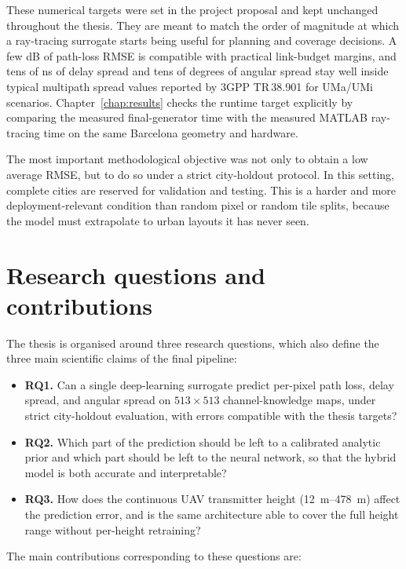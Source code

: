 These numerical targets were set in the project proposal and kept unchanged
throughout the thesis. They are meant to match the order of magnitude at
which a ray-tracing surrogate starts being useful for planning and coverage
decisions. A few dB of path-loss RMSE is compatible with practical link-budget
margins, and tens of ns of delay spread and tens of degrees of angular spread
stay well inside typical multipath spread values reported by 3GPP TR\,38.901
for UMa/UMi scenarios. Chapter~\ref{chap:results} checks the runtime target
explicitly by comparing the measured final-generator time with the measured
MATLAB ray-tracing time on the same Barcelona geometry and hardware.

The most important methodological objective was not only to obtain a low
average RMSE, but to do so under a strict city-holdout protocol. In this
setting, complete cities are reserved for validation and testing. This is a
harder and more deployment-relevant condition than random pixel or random tile
splits, because the model must extrapolate to urban layouts it has never seen.

\section{Research questions and contributions}

The thesis is organised around three research questions, which also define
the three main scientific claims of the final pipeline:

\begin{itemize}
  \item \textbf{RQ1.} Can a single deep-learning surrogate predict per-pixel
        path loss, delay spread, and angular spread on \(513\times513\)
        channel-knowledge maps, under strict city-holdout evaluation, with
        errors compatible with the thesis targets?
  \item \textbf{RQ2.} Which part of the prediction should be left to a
        calibrated analytic prior and which part should be left to the neural
        network, so that the hybrid model is both accurate and interpretable?
  \item \textbf{RQ3.} How does the continuous UAV transmitter height
        (\SIrange{12}{478}{m}) affect the prediction error, and is the same
        architecture able to cover the full height range without per-height
        retraining?
\end{itemize}

The main contributions corresponding to these questions are:

